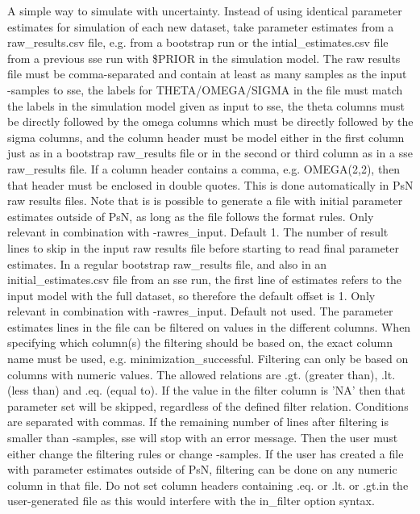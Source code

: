 \begin{optionlist}
\nextopt
{}
A simple way to simulate with uncertainty. Instead of using identical parameter estimates for simulation of each new dataset, take parameter estimates from a raw\_results.csv file, e.g. from a bootstrap run or the intial\_estimates.csv file from a previous sse run with \$PRIOR in the simulation model. The raw results file must be comma-separated and contain at least as many samples as the input -samples to sse, the labels for  THETA/OMEGA/SIGMA in the file must match the labels in the simulation model given as input to sse, the theta columns must be directly followed by the omega columns which must be directly followed by the sigma columns, and the column header must be model either in the first column just as in a bootstrap raw\_results file or in the second or third column as in a sse raw\_results file. If a column header contains a comma, e.g. OMEGA(2,2), then that header must be enclosed in double quotes. This is done automatically in PsN raw results files. Note that is is possible to generate a file with initial parameter estimates outside of PsN, as long as the file follows the format rules. 
\nextopt
{}
Only relevant in combination with -rawres\_input. Default 1. The number of result lines to skip in the input raw results file before starting to read final parameter estimates. In a regular bootstrap raw\_results file, and also in an initial\_estimates.csv file from an sse run, the first line of estimates refers to the input model with the full dataset, so therefore the default offset is 1. 
\nextopt
{}
Only relevant in combination with -rawres\_input. Default not used. The parameter estimates lines in the file can be filtered on values in the different columns. When specifying which column(s) the filtering should be based on, the exact column name must be used, e.g. minimization\_successful. Filtering can only be based on columns with numeric values. The allowed relations are .gt. (greater than), .lt. (less than) and .eq. (equal to). If the value in the filter column is 'NA' then that parameter set will be skipped, regardless of the defined filter relation. Conditions are separated with commas. If the remaining number of lines after filtering is smaller than -samples, sse will stop with an error message. Then the user must either change the filtering rules or change -samples. If the user has created a file with parameter estimates outside of PsN, filtering can be done on any numeric column in that file. Do not set column headers containing .eq. or .lt. or .gt.in the user-generated file as this would interfere with the in\_filter option syntax.



\end{optionlist}
